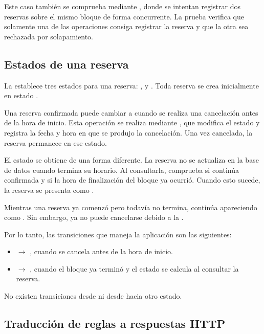 Este caso también se comprueba mediante , donde se
intentan registrar dos reservas sobre el mismo bloque de forma concurrente. La
prueba verifica que solamente una de las operaciones consiga registrar la
reserva y que la otra sea rechazada por solapamiento.

\subsection{Estados de una reserva}
\label{sec:estados-reserva}

La  establece tres estados para una reserva: ,
 y . Toda reserva se crea inicialmente en estado
.

Una reserva confirmada puede cambiar a  cuando se realiza una
cancelación antes de la hora de inicio. Esta operación se realiza mediante
, que modifica el estado y registra la fecha y hora en que
se produjo la cancelación. Una vez cancelada, la reserva permanece en ese estado.

El estado  se obtiene de una forma diferente. La reserva no se
actualiza en la base de datos cuando termina su horario. Al consultarla,
 comprueba si continúa confirmada y si la hora de
finalización del bloque ya ocurrió. Cuando esto sucede, la reserva se presenta
como .

Mientras una reserva ya comenzó pero todavía no termina, continúa apareciendo
como . Sin embargo, ya no puede cancelarse debido a la
.

Por lo tanto, las transiciones que maneja la aplicación son las siguientes:

\begin{itemize}
    \item {} $\rightarrow$ , cuando se cancela antes
    de la hora de inicio.
    \item {} $\rightarrow$ , cuando el bloque ya
    terminó y el estado se calcula al consultar la reserva.
\end{itemize}

No existen transiciones desde  ni desde  hacia
otro estado.

\subsection{Traducción de reglas a respuestas HTTP}
\label{sec:errores}

